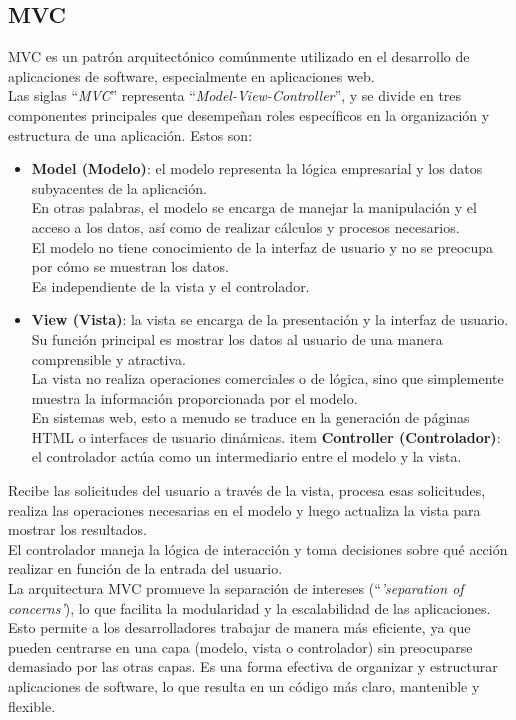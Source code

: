 \subsection{MVC~\cite{fowler2012patterns}}
MVC es un patrón arquitectónico comúnmente utilizado en el desarrollo de aplicaciones de software, 
especialmente en aplicaciones web. \\
Las siglas ``\emph{MVC}'' representa ``\emph{Model-View-Controller}'', y se divide en tres componentes principales 
que desempeñan roles específicos en la organización y estructura de una aplicación. 
Estos son:
\begin{itemize}
    \item \textbf{Model (Modelo)}: el modelo representa la lógica empresarial y los datos subyacentes 
    de la aplicación.\\ En otras palabras, el modelo se encarga de manejar la manipulación y 
    el acceso a los datos, así como de realizar cálculos y procesos necesarios.\\ 
    El modelo no tiene conocimiento de la interfaz de usuario y no se preocupa por cómo se muestran 
    los datos.\\ Es independiente de la vista y el controlador.
    \item \textbf{View (Vista)}: la vista se encarga de la presentación y la interfaz de usuario. \\
    Su función principal es mostrar los datos al usuario de una manera comprensible y atractiva. \\
    La vista no realiza operaciones comerciales o de lógica, sino que simplemente muestra la 
    información proporcionada por el modelo. \\
    En sistemas web, esto a menudo se traduce en la generación de páginas HTML o 
    interfaces de usuario dinámicas.
    item \textbf{Controller (Controlador)}: el controlador actúa como un intermediario entre el modelo y la vista. 
\end{itemize}

Recibe las solicitudes del usuario a través de la vista, procesa esas solicitudes, 
realiza las operaciones necesarias en el modelo y luego actualiza la vista para mostrar los resultados.\\
El controlador maneja la lógica de interacción y toma decisiones sobre qué acción realizar 
en función de la entrada del usuario.\\
La arquitectura MVC promueve la separación de intereses (``\emph{'separation of concerns'}), lo que facilita 
la modularidad y la escalabilidad de las aplicaciones. Esto permite a los desarrolladores trabajar de manera 
más eficiente, ya que pueden centrarse en una capa (modelo, vista o controlador) sin preocuparse 
demasiado por las otras capas. Es una forma efectiva de organizar y estructurar aplicaciones de 
software, lo que resulta en un código más claro, mantenible y flexible.

